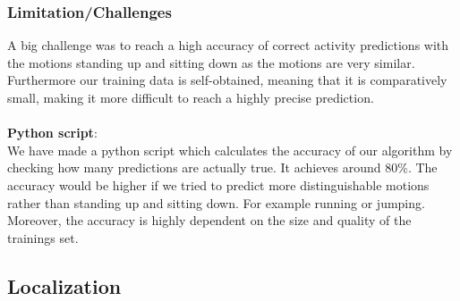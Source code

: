 \documentclass[12pt]{article}
\begin{document}
\pagebreak

\subsubsection{Limitation/Challenges}
A big challenge was to reach a high accuracy of correct activity predictions with the motions standing up and sitting down as the motions are very similar.
Furthermore our training data is self-obtained, meaning that it is comparatively small, making it more difficult to reach a highly precise prediction.
\\\\
\textbf{Python script}:\\
We have made a python script which calculates the accuracy of our algorithm by checking how many predictions are actually true. It achieves around \(80\%\). The accuracy would be higher if we tried to predict more distinguishable motions rather than standing up and sitting down. For example running or jumping. Moreover, the accuracy is highly dependent on the size and quality of the trainings set.

\subsection{Localization} \label{sec:localization}
\end{document}
